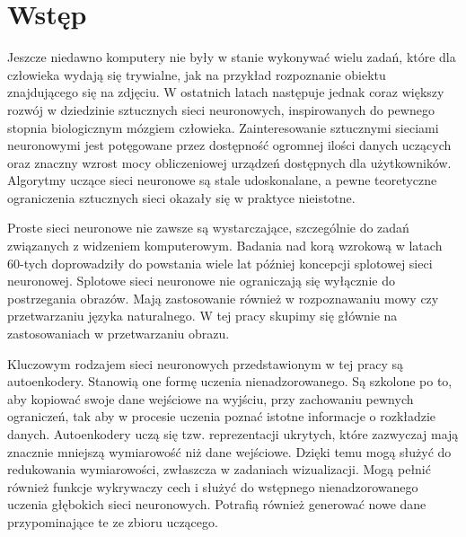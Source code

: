 \documentclass[12pt]{mwbk}
\theoremstyle{plain}
\theoremstyle{definition}
\theoremstyle{remark}
\begin{document}



\tableofcontents


\chapter*{Wstęp}

Jeszcze niedawno komputery nie były w stanie wykonywać wielu zadań, które dla człowieka wydają się trywialne, jak na przykład rozpoznanie obiektu znajdującego się na zdjęciu. W ostatnich latach następuje jednak coraz większy rozwój w dziedzinie sztucznych sieci neuronowych, inspirowanych do pewnego stopnia biologicznym mózgiem człowieka. Zainteresowanie sztucznymi sieciami neuronowymi jest potęgowane przez dostępność ogromnej ilości danych uczących oraz znaczny wzrost mocy obliczeniowej urządzeń dostępnych dla użytkowników. Algorytmy uczące sieci neuronowe są stale udoskonalane, a pewne teoretyczne ograniczenia sztucznych sieci okazały się w praktyce nieistotne.

Proste sieci neuronowe nie zawsze są wystarczające, szczególnie do zadań związanych z widzeniem komputerowym. Badania nad korą wzrokową w latach 60-tych doprowadziły do powstania wiele lat później koncepcji splotowej sieci neuronowej. Splotowe sieci neuronowe nie ograniczają się wyłącznie do postrzegania obrazów. Mają zastosowanie również w rozpoznawaniu mowy czy przetwarzaniu języka naturalnego. W tej pracy skupimy się głównie na zastosowaniach w przetwarzaniu obrazu.

Kluczowym rodzajem sieci neuronowych przedstawionym w tej pracy są autoenkodery.  Stanowią one formę uczenia nienadzorowanego. Są szkolone po to, aby kopiować swoje dane wejściowe na wyjściu, przy zachowaniu pewnych ograniczeń, tak aby w procesie uczenia poznać istotne informacje o rozkładzie danych. Autoenkodery uczą się tzw. reprezentacji ukrytych, które zazwyczaj mają znacznie mniejszą wymiarowość niż dane wejściowe. Dzięki temu mogą służyć do redukowania wymiarowości, zwłaszcza w zadaniach wizualizacji. Mogą pełnić również funkcje wykrywaczy cech i służyć do wstępnego nienadzorowanego uczenia głębokich sieci neuronowych. Potrafią również generować nowe dane przypominające te ze zbioru uczącego.
\end{document}
